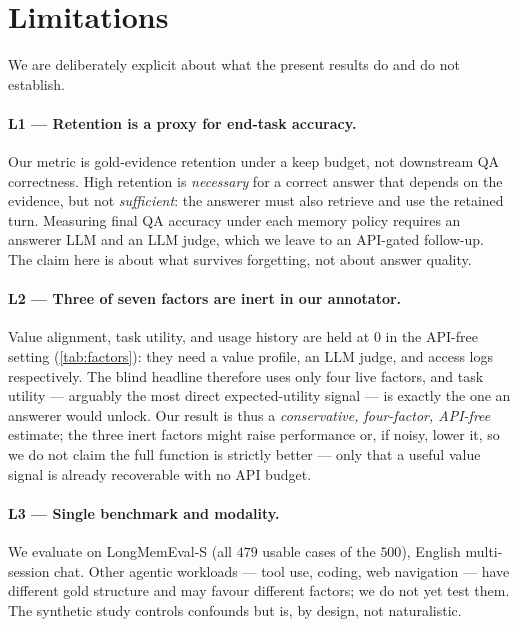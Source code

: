 \section{Limitations}
\label{sec:limitations}

We are deliberately explicit about what the present results do and do not
establish.

\paragraph{L1 --- Retention is a proxy for end-task accuracy.}
Our metric is gold-evidence retention under a keep budget, not downstream
QA correctness. High retention is \emph{necessary} for a correct answer
that depends on the evidence, but not \emph{sufficient}: the answerer
must also retrieve and use the retained turn. Measuring final QA accuracy
under each memory policy requires an answerer LLM and an LLM judge, which
we leave to an API-gated follow-up. The claim here is about what survives
forgetting, not about answer quality.

\paragraph{L2 --- Three of seven factors are inert in our annotator.}
Value alignment, task utility, and usage history are held at $0$ in the
API-free setting (\cref{tab:factors}): they need a value profile, an LLM
judge, and access logs respectively. The blind headline therefore uses
only four live factors, and task utility --- arguably the most direct
expected-utility signal --- is exactly the one an answerer would unlock.
Our result is thus a \emph{conservative, four-factor, API-free} estimate;
the three inert factors might raise performance or, if noisy, lower it, so
we do not claim the full function is strictly better --- only that a
useful value signal is already recoverable with no API budget.

\paragraph{L3 --- Single benchmark and modality.}
We evaluate on LongMemEval-S (all $479$ usable cases of the $500$),
English multi-session chat. Other agentic workloads --- tool use, coding,
web navigation --- have different gold structure and may favour different
factors; we do not yet test them. The synthetic study controls confounds
but is, by design, not naturalistic.

